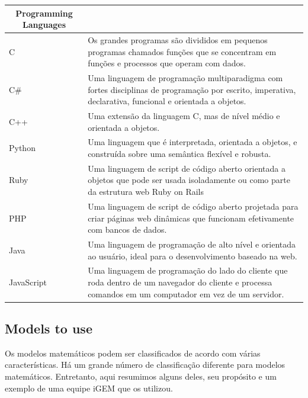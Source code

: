 \documentclass[11pt, letterpaper, portuguese]{article}
\begin{document}
\begin{table}[h]
\begin{tabular}{| m{3cm} | m{9cm}|}
\hline
\multicolumn{1}{|c|}{\textbf{Programming Languages}}                                                                                                           \\ \hline
C & Os grandes programas são divididos em pequenos programas chamados funções que se concentram em funções e processos que operam com dados. \\ \hline
\multicolumn{1}{|l|}{C\#} &
  Uma linguagem de programação multiparadigma com fortes disciplinas de programação por escrito, imperativa, declarativa, funcional e orientada a objetos. \\ \hline
\multicolumn{1}{|l|}{C++}    & Uma extensão da linguagem C, mas de nível médio e orientada a objetos.                                                  \\ \hline
\multicolumn{1}{|l|}{Python} & Uma linguagem que é interpretada, orientada a objetos, e construída sobre uma semântica flexível e robusta.                                    \\ \hline
\multicolumn{1}{|l|}{Ruby}   & Uma linguagem de script de código aberto orientada a objetos que pode ser usada isoladamente ou como parte da estrutura web Ruby on Rails   \\ \hline
\multicolumn{1}{|l|}{PHP}    & Uma linguagem de script de código aberto projetada para criar páginas web dinâmicas que funcionam efetivamente com bancos de dados.                    \\ \hline
\multicolumn{1}{|l|}{Java}   & Uma linguagem de programação de alto nível e orientada ao usuário, ideal para o desenvolvimento baseado na web.                                              \\ \hline
\multicolumn{1}{|l|}{JavaScript} &
  Uma linguagem de programação do lado do cliente que roda dentro de um navegador do cliente e processa comandos em um computador em vez de um servidor. \\ \hline
\end{tabular}
\end{table}


\subsection{Models to use}
\par{Os modelos matemáticos podem ser classificados de acordo com várias características. Há um grande número de classificação diferente para modelos matemáticos. Entretanto, aqui resumimos alguns deles, seu propósito e um exemplo de uma equipe iGEM que os utilizou.} 
\end{document}

